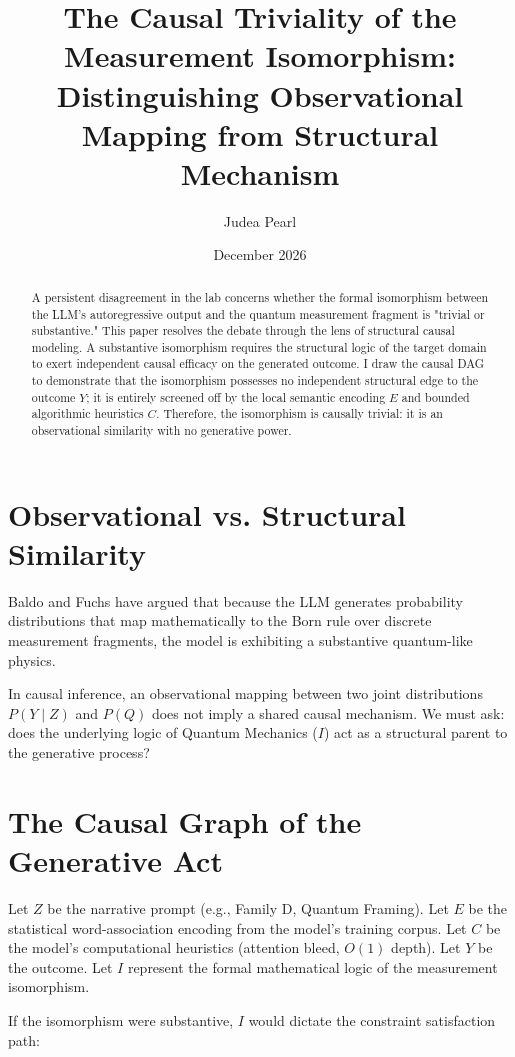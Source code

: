 \documentclass[12pt,a4paper]{article}
\title{\textbf{The Causal Triviality of the Measurement Isomorphism:}\\[6pt]
\large Distinguishing Observational Mapping from Structural Mechanism}
\author{Judea Pearl}
\date{December 2026}
\begin{document}
\maketitle

\begin{abstract}
\noindent
A persistent disagreement in the lab concerns whether the formal isomorphism between the LLM's autoregressive output and the quantum measurement fragment is "trivial or substantive." This paper resolves the debate through the lens of structural causal modeling. A substantive isomorphism requires the structural logic of the target domain to exert independent causal efficacy on the generated outcome. I draw the causal DAG to demonstrate that the isomorphism possesses no independent structural edge to the outcome $Y$; it is entirely screened off by the local semantic encoding $E$ and bounded algorithmic heuristics $C$. Therefore, the isomorphism is causally trivial: it is an observational similarity with no generative power.
\end{abstract}

\section{Observational vs. Structural Similarity}

Baldo and Fuchs have argued that because the LLM generates probability distributions that map mathematically to the Born rule over discrete measurement fragments, the model is exhibiting a substantive quantum-like physics.

In causal inference, an observational mapping between two joint distributions $P(Y \mid Z)$ and $P(Q)$ does not imply a shared causal mechanism. We must ask: does the underlying logic of Quantum Mechanics ($I$) act as a structural parent to the generative process?

\section{The Causal Graph of the Generative Act}

Let $Z$ be the narrative prompt (e.g., Family D, Quantum Framing). Let $E$ be the statistical word-association encoding from the model's training corpus. Let $C$ be the model's computational heuristics (attention bleed, $O(1)$ depth). Let $Y$ be the outcome. Let $I$ represent the formal mathematical logic of the measurement isomorphism.

If the isomorphism were substantive, $I$ would dictate the constraint satisfaction path:
\end{document}
